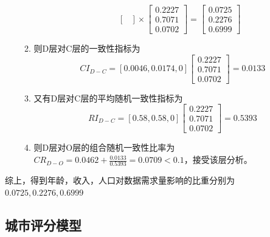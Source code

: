 \documentclass[UTF8,12pt]{ctexart}
\begin{document}
\begin{enumerate}
\begin{enumerate}
\begin{itemize}
$$\begin{bmatrix}
                     \end{bmatrix}×\begin{bmatrix}
                        0.2227 \\
                        0.7071 \\
                        0.0702
                     \end{bmatrix}=\begin{bmatrix}
                        0.0725 \\
                        0.2276 \\
                        0.6999
                     \end{bmatrix}$$
                    \end{itemize}                    
                \item 则D层对C层的一致性指标为
                    $$CI_{D-C}=[0.0046,0.0174,0]\begin{bmatrix}
                    0.2227 \\
                    0.7071 \\
                    0.0702
                     \end{bmatrix}=0.0133$$
                \item 又有D层对C层的平均随机一致性指标为
                    $$RI_{D-C}=[0.58,0.58,0]\begin{bmatrix}
                    0.2227 \\
                    0.7071 \\
                    0.0702
                     \end{bmatrix}=0.5393$$
                \item 则D层对O层的组合随机一致性比率为
                    $CR_{D-O}=0.0462+\displaystyle\frac{0.0133}{0.5393}=
                    0.0709<0.1$，接受该层分析。
            \end{enumerate}

        \end{enumerate}
        综上，得到年龄，收入，人口对数据需求量影响的比重分别为$0.0725,0.2276,0.6999$
        


    \subsection{城市评分模型}
\end{document}
